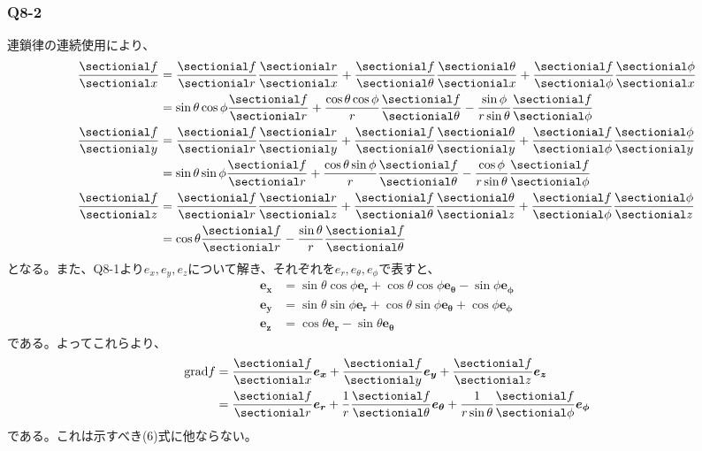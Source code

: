 \documentclass[platex,dvipdfmx,a4paper]{jsarticle}
\newcommand{\hb}[2]{\frac{\sectionial #1}{\sectionial #2}}
\newcommand{\vect}[1]{\boldsymbol{#1}}
\begin{document}
  \subsubsection*{Q8-2}
  連鎖律の連続使用により、
  \begin{align*}
    \hb{f}{x} &=\hb{f}{r}\hb{r}{x}+\hb{f}{\theta}\hb{\theta}{x}+\hb{f}{\phi}\hb{\phi}{x}\\
              &=\sin{\theta}\cos{\phi}\hb{f}{r}+\frac{\cos{\theta}\cos{\phi}}{r}\hb{f}{\theta}-\frac{\sin{\phi}}{r\sin{\theta}}\hb{f}{\phi}\\
    \hb{f}{y} &=\hb{f}{r}\hb{r}{y}+\hb{f}{\theta}\hb{\theta}{y}+\hb{f}{\phi}\hb{\phi}{y}\\
              &=\sin{\theta}\sin{\phi}\hb{f}{r}+\frac{\cos{\theta}\sin{\phi}}{r}\hb{f}{\theta}-\frac{\cos{\phi}}{r\sin{\theta}}\hb{f}{\phi}\\
    \hb{f}{z} &=\hb{f}{r}\hb{r}{z}+\hb{f}{\theta}\hb{\theta}{z}+\hb{f}{\phi}\hb{\phi}{z}\\
              &=\cos{\theta}\hb{f}{r}-\frac{\sin{\theta}}{r}\hb{f}{\theta}
  \end{align*}
  となる。また、Q8-1より$e_x,e_y,e_z$について解き、それぞれを$e_r,e_{\theta},e_{\phi}$で表すと、
  \begin{align*}
    \vect{e_x} &=\sin{\theta}\cos{\phi}\vect{e_r}+\cos{\theta}\cos{\phi}\vect{e_\theta}-\sin{\phi}\vect{e_\phi}\\
    \vect{e_y} &=\sin{\theta}\sin{\phi}\vect{e_r}+\cos{\theta}\sin{\phi}\vect{e_\theta}+\cos{\phi}\vect{e_\phi}\\
    \vect{e_z} &=\cos{\theta}\vect{e_r}-\sin{\theta}\vect{e_\theta}
  \end{align*}
  である。よってこれらより、
  \begin{align*}
    \mathrm{grad} f &=\hb{f}{x}\vect{e_x}+\hb{f}{y}\vect{e_y}+\hb{f}{z}\vect{e_z}\\
    &=\hb{f}{r}\vect{e_r}+\frac{1}{r}\hb{f}{\theta}\vect{e_\theta}+\frac{1}{r\sin{\theta}}\hb{f}{\phi}\vect{e_\phi}
  \end{align*}
  である。これは示すべき(6)式に他ならない。
\end{document}
